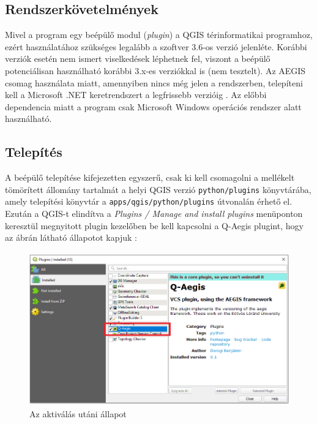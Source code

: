 \subsection{Rendszerkövetelmények}
Mivel a program egy beépülő modul (\emph{plugin}) a QGIS térinformatikai programhoz, ezért használatához szükséges legalább a szoftver 3.6-os verzió jelenléte.  Korábbi verziók esetén nem ismert viselkedések léphetnek fel, viszont a beépülő potenciálisan használható korábbi 3.x-es verziókkal is (nem tesztelt). Az AEGIS csomag használata miatt, amennyiben nincs még jelen a rendszerben, telepíteni kell a Microsoft .NET keretrendszert a legfrissebb verzióig . Az előbbi dependencia miatt a program csak Microsoft Windows operációs rendszer alatt használható. 
\subsection{Telepítés}
A beépülő telepítése kifejezetten egyszerű, csak ki kell csomagolni a mellékelt tömörített állomány tartalmát a helyi QGIS verzió \texttt{python/plugins} könyvtárába, amely telepítési könyvtár a \texttt{apps/qgis/python/plugins} útvonalán érhető el. Ezután a QGIS-t elindítva a \emph{Plugins / Manage and install plugins} menüponton keresztül megnyitott plugin kezelőben be kell kapcsolni a Q-Aegis plugint, hogy az ábrán látható állapotot kapjuk :
\begin{figure}[H]
	\centering
	\includegraphics[width=\textwidth,height=250px]{images/enable_plugin}
	\caption{Az aktiválás utáni állapot}
	\label{fig:picture-1}
\end{figure}

